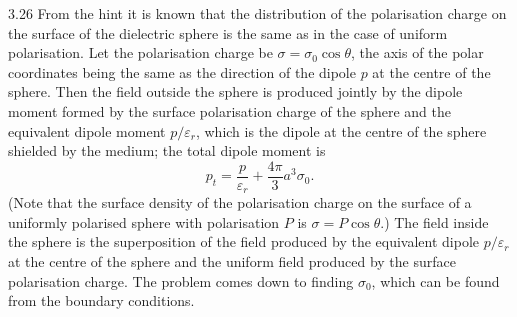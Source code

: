 \begin{solution}{3.26}
From the hint it is known that the distribution of the polarisation charge on the surface of the dielectric sphere is the same as in the case of uniform polarisation. Let the polarisation charge be $\sigma=\sigma_0\cos\theta$, the axis of the polar coordinates being the same as the direction of the dipole $p$ at the centre of the sphere. Then the field outside the sphere is produced jointly by the dipole moment formed by the surface polarisation charge of the sphere and the equivalent dipole moment $p/\varepsilon_r$, which is the dipole at the centre of the sphere shielded by the medium; the total dipole moment is
\[
p_t=\frac{p}{\varepsilon_r}+\frac{4\pi}{3}a^3\sigma_0.
\]
(Note that the surface density of the polarisation charge on the surface of a uniformly polarised sphere with polarisation $P$ is $\sigma=P\cos\theta$.) The field inside the sphere is the superposition of the field produced by the equivalent dipole $p/\varepsilon_r$ at the centre of the sphere and the uniform field produced by the surface polarisation charge. The problem comes down to finding $\sigma_0$, which can be found from the boundary conditions.


\end{solution}
